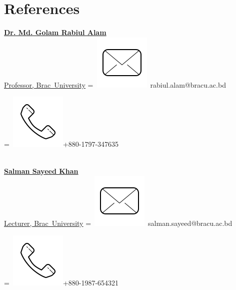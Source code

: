 \documentclass[]{plushcv}
\begin{document}
\begin{minipage}[t]{0.32\textwidth}
\section{References} 
\href{https://www.bracu.ac.bd/about/people/md-golam-rabiul-alam-phd}{\textbf{Dr. Md. Golam Rabiul Alam} \\Professor, Brac~University}
\begingroup
{}=\hbox{
\includegraphics[scale=0.1,trim={0 1cm 0cm 0cm}]{icons/main/mail.png}\hspace{0.3cm} rabiul.alam@bracu.ac.bd
}
\parbox{\wd0}{}
\endgroup
\begingroup
{}=\hbox{
\includegraphics[scale=0.1,trim={0 1.25cm -0.4cm 0cm}]{icons/main/phone.png}\hspace{0.3cm}+880-1797-347635 
}
\parbox{\wd0}{}\endgroup
\\
\sectionsep
\href{https://www.bracu.ac.bd/about/people/salman-sayeed-khan}{\textbf{Salman Sayeed Khan} \\Lecturer, Brac~University}
\begingroup
{}=\hbox{
\includegraphics[scale=0.1,trim={0 1cm 0cm 0cm}]{icons/main/mail.png}\hspace{0.3cm} salman.sayeed@bracu.ac.bd
}
\parbox{\wd0}{}
\endgroup
\begingroup
{}=\hbox{
\includegraphics[scale=0.1,trim={0 1.25cm -0.4cm 0cm}]{icons/main/phone.png}\hspace{0.3cm}+880-1987-654321
}
\parbox{\wd0}{}\endgroup
\\





\end{minipage}
\end{document}
